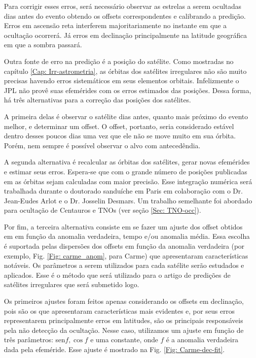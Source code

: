 \documentclass[12pt,a4paper]{monografia}
\begin{document}
Para corrigir esses erros, será necessário observar as estrelas a serem ocultadas dias antes do evento obtendo os offsets correspondentes e calibrando a predição. Erros em ascensão reta interferem majoritariamente no instante em que a ocultação ocorrerá. Já erros em declinação principalmente na latitude geográfica em que a sombra passará.

Outra fonte de erro na predição é a posição do satélite. Como mostradas no capítulo \ref{Cap: Irr-astrometria}, as órbitas dos satélites irregulares não são muito precisas havendo erros sistemáticos em seus elementos orbitais. Infelizmente o JPL não provê suas efemérides com os erros estimados das posições. Dessa forma, há três alternativas para a correção das posições dos satélites.

A primeira delas é observar o satélite dias antes, quanto mais próximo do evento melhor, e determinar um offset. O offset, portanto, seria considerado estável dentro desses poucos dias uma vez que ele não se move muito em sua órbita. Porém, nem sempre é possível observar o alvo com antecedêndia.

A segunda alternativa é recalcular as órbitas dos satélites, gerar novas efemérides e estimar seus erros. Espera-se que com o grande número de posições publicadas em \cite{GomesJunior2015-Irregular} as órbitas sejam calculadas com maior precisão. Esse integração numérica será trabalhada durante o doutorado sanduíche em Paris em colaboração com o Dr. Jean-Eudes Arlot e o Dr. Josselin Desmars. Um trabalho semelhante foi abordado para ocultação de Centauros e TNOs (ver seção \ref{Sec: TNO-occ}).

Por fim, a terceira alternativa consiste em se fazer um ajuste dos offset obtidos em \cite{GomesJunior2015-Irregular} em função da anomalia verdadeira, tempo e/ou anomalia média. Essa escolha é suportada pelas dispersões dos offsets em função da anomalia verdadeira (por exemplo, Fig. \ref{Fig: carme_anom}, para Carme) que apresentaram características notáveis. Os parâmetros a serem utilizados para cada satélite serão estudados e aplicados. Esse é o método que será utilizado para o artigo de predições de satélites irregulares que será submetido logo.

Os primeiros ajustes foram feitos apenas considerando os offsets em declinação, pois são os que apresentaram características mais evidentes e, por seus erros representarem principalmente erros em latitudes, são os principais responsáveis pela não detecção da ocultação. Nesse caso, utilizamos um ajuste em função de três parâmetros: sen${f}, \cos{f}$ e uma constante, onde $f$ é a anomalia verdadeira dada pela efeméride. Esse ajuste é mostrado na Fig. \ref{Fig: Carme-dec-fit}.
\end{document}
